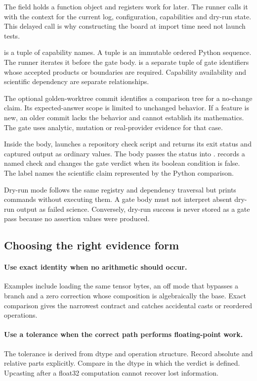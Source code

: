 The  field holds a function object and registers work for later.
The runner calls it with the context for the current log, configuration,
capabilities and dry-run state.  This delayed
call is why constructing the board at import time need not launch tests.

 is a tuple of capability names.  A tuple is an immutable ordered
Python sequence.  The runner iterates it before the gate body.   is
a separate tuple of gate identifiers whose accepted products or boundaries
are required.  Capability availability and scientific dependency are
separate relationships.

The optional golden-worktree commit identifies a comparison tree for a
no-change claim.  Its expected-answer scope is limited to unchanged behavior.
If a feature is new, an older commit lacks the behavior and cannot establish its mathematics.
The gate uses analytic, mutation or real-provider evidence for that case.

Inside the body,  launches a repository check script
and returns its exit status and captured output as ordinary values.  The body
passes the status into .
 records a named check and changes the gate verdict when its
boolean condition is false.  The label names the scientific claim represented
by the Python comparison.

Dry-run mode follows the same registry and dependency traversal but prints
commands without executing them.  A gate body must not interpret absent
dry-run output as failed science.  Conversely, dry-run success is never stored
as a gate pass because no assertion values were produced.

\subsection{Choosing the right evidence form}

\paragraph{Use exact identity when no arithmetic should occur.}
Examples include loading the same tensor bytes, an off mode that bypasses a
branch and a zero correction whose composition is algebraically the base.
Exact comparison gives the narrowest contract and catches accidental
casts or reordered operations.

\paragraph{Use a tolerance when the correct path performs floating-point work.}
The tolerance is derived from dtype and operation structure.  Record absolute
and relative parts explicitly.  Compare in the dtype in which the verdict is
defined.  Upcasting after a float32 computation cannot recover lost
information.


